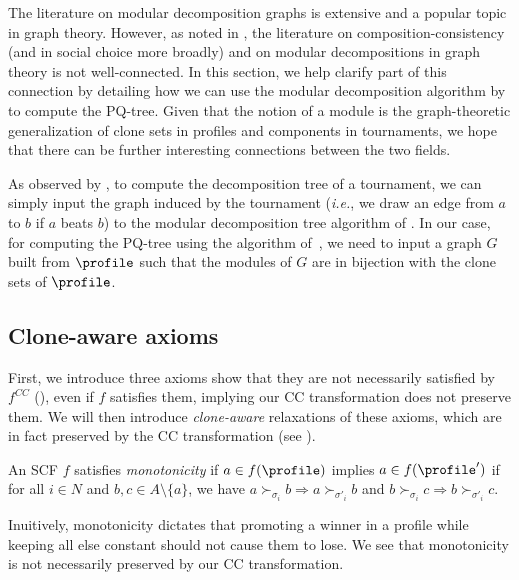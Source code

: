 \begin{enumerate}
    The literature on modular decomposition graphs is extensive and a popular topic in graph theory. 
    However, as noted in \citet{Brandt18:Extending}, the literature on composition-consistency (and in social choice more broadly) and on modular decompositions in graph theory is not well-connected.
    In this section, we help clarify part of this connection by detailing how we can use the modular decomposition algorithm by \citet{Capelle02:Graph} to compute the PQ-tree.
    Given that the notion of a module is the graph-theoretic generalization of clone sets in profiles and components in tournaments, we hope that there can be further interesting connections between the two fields.
\end{enumerate}

As observed by \citet{Brandt18:Extending},
to compute the decomposition tree of a tournament, we can simply input the graph induced by the tournament (\emph{i.e.}, we draw an edge from $a$ to $b$ if $a$ beats $b$) to the modular decomposition tree algorithm of \citet{Capelle02:Graph}.
In our case, for computing the PQ-tree using the algorithm of~\citep{Capelle02:Graph}, we need to input a graph $G$ built from $\profile$ such that the modules of $G$ are in bijection with the clone sets of $\profile$. 

\subsection{Clone-aware axioms}\label{appsec:ca-axioms}
First, we introduce three axioms show that they are not necessarily satisfied by $f^{CC}$ (), even if $f$ satisfies them, implying our CC transformation does not preserve them. We will then introduce \emph{clone-aware} relaxations of these axioms, which are in fact preserved by the CC transformation (see ). 

\begin{definition}\label{def:mono}
    An SCF $f$ satisfies \emph{monotonicity} if $a \in f(\profile)$ implies $a \in f(\profile')$ if for all $i \in N$ and $b,c \in A \setminus\{a\}$, we have $a \succ_{\sigma_i} b \Rightarrow a \succ_{\sigma'_i} b$ and $b \succ_{\sigma_i} c \Rightarrow b \succ_{\sigma'_i} c$.
\end{definition}

Inuitively, monotonicity dictates that promoting a winner in a profile while keeping all else constant should not cause them to lose. We see that monotonicity is not necessarily preserved by our CC transformation.


